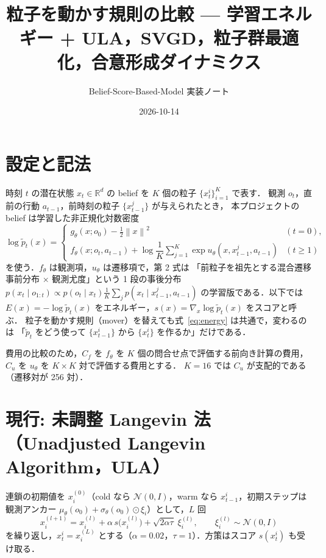 \documentclass[a4paper,11pt]{article}
\title{粒子を動かす規則の比較 --- 学習エネルギー + ULA，SVGD，粒子群最適化，合意形成ダイナミクス}
\author{Belief-Score-Based-Model 実装ノート}
\date{2026-10-14}
\newcommand{\RR}{\mathbb{R}}
\newcommand{\ptil}{\tilde p_t}
\newcommand{\nrm}[1]{\left\lVert #1 \right\rVert}
\begin{document}
\maketitle

\section{設定と記法}

時刻 $t$ の潜在状態 $x_t \in \RR^d$ の belief を $K$ 個の粒子 $\{x_t^i\}_{i=1}^K$ で表す．
観測 $o_t$，直前の行動 $a_{t-1}$，前時刻の粒子 $\{x_{t-1}^j\}$ が与えられたとき，
本プロジェクトの belief は学習した非正規化対数密度
\begin{equation}
  \log \ptil(x) =
  \begin{cases}
    g_\theta(x; o_0) - \tfrac12 \nrm{x}^2 & (t = 0),\\[2pt]
    f_\theta(x; o_t, a_{t-1}) + \log \dfrac1K \sum_{j=1}^K \exp u_\theta(x, x_{t-1}^j, a_{t-1}) & (t \ge 1)
  \end{cases}
  \label{eq:energy}
\end{equation}
を使う．$f_\theta$ は観測項，$u_\theta$ は遷移項で，第 2 式は
「前粒子を祖先とする混合遷移事前分布 $\times$ 観測尤度」という 1 段の事後分布
$p(x_t \mid o_{1:t}) \propto p(o_t \mid x_t) \frac1K \sum_j p(x_t \mid x_{t-1}^j, a_{t-1})$
の学習版である．以下では $E(x) = -\log \ptil(x)$ をエネルギー，$s(x) = \nabla_x \log \ptil(x)$ をスコアと呼ぶ．
粒子を動かす規則（mover）を替えても式~\eqref{eq:energy} は共通で，変わるのは
「$\ptil$ をどう使って $\{x_{t-1}^i\}$ から $\{x_t^i\}$ を作るか」だけである．

費用の比較のため，$C_f$ を $f_\theta$ を $K$ 個の問合せ点で評価する前向き計算の費用，
$C_u$ を $u_\theta$ を $K \times K$ 対で評価する費用とする．
$K = 16$ では $C_u$ が支配的である（遷移対が 256 対）．

\section{現行: 未調整 Langevin 法（Unadjusted Langevin Algorithm，ULA）}

連鎖の初期値を $x^{(0)}_i$（cold なら $\mathcal N(0, I)$，warm なら $x_{t-1}^i$，初期ステップは観測アンカー
$\mu_\theta(o_0) + \sigma_\theta(o_0) \odot \xi_i$）として，$L$ 回
\begin{equation}
  x_i^{(l+1)} = x_i^{(l)} + \alpha\, s\big(x_i^{(l)}\big) + \sqrt{2 \alpha \tau}\; \xi_i^{(l)}, \qquad \xi_i^{(l)} \sim \mathcal N(0, I)
  \label{eq:ula}
\end{equation}
を繰り返し，$x_t^i = x_i^{(L)}$ とする（$\alpha = 0.02$，$\tau = 1$）．方策はスコア $s(x_t^i)$ も受け取る．
\end{document}
